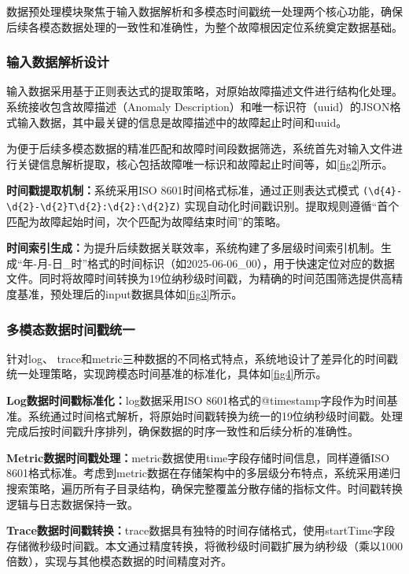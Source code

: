\documentclass[11pt]{article}
\begin{document}
数据预处理模块聚焦于输入数据解析和多模态时间戳统一处理两个核心功能，确保后续各模态数据处理的一致性和准确性，为整个故障根因定位系统奠定数据基础。

\subsubsection{输入数据解析设计}
\label{sec:input-data-parse}

输入数据采用基于正则表达式的提取策略，对原始故障描述文件进行结构化处理。系统接收包含故障描述（Anomaly Description）和唯一标识符（uuid）的JSON格式输入数据，其中最关键的信息是故障描述中的故障起止时间和uuid。

为便于后续多模态数据的精准匹配和故障时间段数据筛选，系统首先对输入文件进行关键信息解析提取，核心包括故障唯一标识和故障起止时间等，如\ref{fig2}所示。

\textbf{时间戳提取机制：}系统采用ISO 8601时间格式标准，通过正则表达式模式 \verb!(\d{4}-\d{2}-\d{2}T\d{2}:\d{2}:\d{2}Z)! 实现自动化时间戳识别。提取规则遵循“首个匹配为故障起始时间，次个匹配为故障结束时间”的策略。

\textbf{时间索引生成：}为提升后续数据关联效率，系统构建了多层级时间索引机制。生成“年-月-日\_时”格式的时间标识（如2025-06-06\_00），用于快速定位对应的数据文件。同时将故障时间转换为19位纳秒级时间戳，为精确的时间范围筛选提供高精度基准，预处理后的input数据具体如\ref{fig3}所示。

\subsubsection{多模态数据时间戳统一}
\label{sec:multi-modal-timestamp-unify}

针对log、 trace和metric三种数据的不同格式特点，系统地设计了差异化的时间戳统一处理策略，实现跨模态时间基准的标准化，具体如\ref{fig4}所示。

\textbf{Log数据时间戳标准化：}log数据采用ISO 8601格式的@timestamp字段作为时间基准。系统通过时间格式解析，将原始时间戳转换为统一的19位纳秒级时间戳。处理完成后按时间戳升序排列，确保数据的时序一致性和后续分析的准确性。

\textbf{Metric数据时间戳处理：}metric数据使用time字段存储时间信息，同样遵循ISO 8601格式标准。考虑到metric数据在存储架构中的多层级分布特点，系统采用递归搜索策略，遍历所有子目录结构，确保完整覆盖分散存储的指标文件。时间戳转换逻辑与日志数据保持一致。

\textbf{Trace数据时间戳转换：}trace数据具有独特的时间存储格式，使用startTime字段存储微秒级时间戳。本文通过精度转换，将微秒级时间戳扩展为纳秒级（乘以1000倍数），实现与其他模态数据的时间精度对齐。
\end{document}

